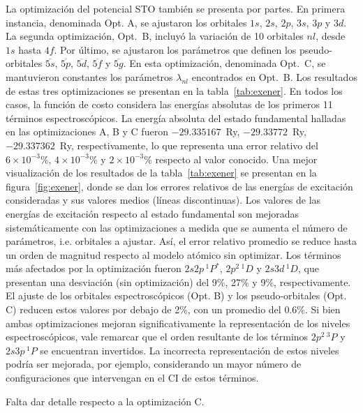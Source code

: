 La optimización del potencial STO también se presenta por partes. En 
primera instancia, denominada Opt. A, se ajustaron los orbitales $1s$, 
$2s$, $2p$, $3s$, $3p$ y $3d$. La segunda optimización, Opt.~B, incluyó
la variación de 10 orbitales $nl$, desde $1s$ hasta $4f$. Por último, se 
ajustaron los parámetros que definen los pseudo-orbitales 
$\overline{5s}$, $\overline{5p}$, $\overline{5d}$, $\overline{5f}$ y 
$\overline{5g}$. En esta optimización, denominada Opt.~C, se mantuvieron 
constantes los parámetros $\lambda_{nl}$ encontrados en Opt.~B. Los 
resultados de estas tres optimizaciones se presentan en la 
tabla~\ref{tab:exener}. En todos los casos, la función de costo considera 
las energías absolutas de los primeros 11 términos espectroscópicos. La 
energía absoluta del estado fundamental halladas en las optimizaciones 
A, B y C fueron $-29.335167$~Ry, $-29.33772$~Ry, $-29.337362$~Ry, 
respectivamente, lo que representa una error relativo del 
$6\times 10^{-3}\%$, $4\times 10^{-3}\%$ y $2\times 10^{-3}\%$ respecto 
al valor conocido. Una mejor visualización de los resultados de la 
tabla~\ref{tab:exener} se presentan en la figura~\ref{fig:exener}, donde 
se dan los errores relativos de las energías de excitación consideradas 
y sus valores medios (líneas discontinuas). Los valores de las energías 
de excitación respecto al estado fundamental son mejoradas 
sistemáticamente con las optimizaciones a medida que se aumenta el número 
de parámetros, i.e. orbitales a ajustar. Así, el error relativo promedio 
se reduce hasta un orden de magnitud respecto al modelo atómico sin 
optimizar. Los términos más afectados por la optimización fueron 
$2s2p\,^1P^*$, $2p^2\,^1D$ y $2s3d\,^1D$, que presentan una desviación 
(sin optimización) del 9\%, 27\% y 9\%, respectivamente. El ajuste de los 
orbitales espectroscópicos (Opt. B) y los pseudo-orbitales (Opt. C) 
reducen estos valores por debajo de 2\%, con un promedio del $0.6\%$. Si 
bien ambas optimizaciones mejoran significativamente la representación de 
los niveles espectroscópicos, vale remarcar que el orden resultante de 
los términos $2p^2\,^3P$ y $2s3p\,^1P$ se encuentran invertidos. La 
incorrecta representación de estos niveles podría ser mejorada, por 
ejemplo, considerando un mayor número de configuraciones que intervengan 
en el CI de estos términos.

{\color{red} Falta dar detalle respecto a la optimización C.}


